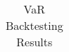 \begin{table}
\caption{VaR Backtesting Results}
\label{tab:var_backtest}
\begin{tabular}{}
\toprule
\midrule
\bottomrule
\end{tabular}
\end{table}
